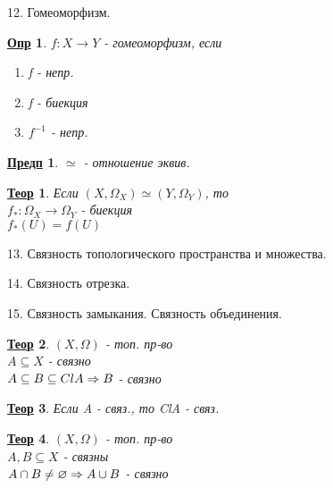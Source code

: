 \documentclass[12pt, fleqn]{article}
\newenvironment{question}[1]{\hspace*{-4em} #1}{\newpage}
\newcommand{\ra}{\Rightarrow}
\theoremstyle{nonumbermarginbreak}
\newtheorem{theorem}{\hspace*{-2em}\underline{\bfseries Теор}}[section]
\newtheorem{definition}{\hspace*{-2em}\underline{\bfseries Опр}}[section]
\newtheorem{hypothesis}{\hspace*{-2em}\underline{\bfseries Предп}}[section]
\begin{document}
    \begin{question}{12. Гомеоморфизм.}
        \begin{definition} 
            $f: X \rightarrow Y$ - гомеоморфизм, если\\
            \begin{enumerate}
                \item f - непр.
                \item f - биекция
                \item $f^{-1}$ - непр.
            \end{enumerate}
        \end{definition}

        \begin{hypothesis} 
            $\simeq$ - отношение эквив.
        \end{hypothesis}

        \begin{theorem} 
            Если $(X, \Omega_X) \simeq (Y, \Omega_Y)$, то\\
            $f_*: \Omega_X \rightarrow \Omega_Y$ - биекция\\
            $f_*(U) = f(U)$
        \end{theorem}
    \end{question}

    \begin{question}{13. Связность топологического пространства и множества.}
        
    \end{question}

    \begin{question}{14. Связность отрезка.}
        
    \end{question}

    \begin{question}{15. Связность замыкания. Связность объединения.}
        \begin{theorem} 
            $(X, \Omega)$ - топ. пр-во\\
            $A \subseteq X$ - связно\\
            $A \subseteq B \subseteq Cl A\\ \ra B$ - связно
        \end{theorem}

        \begin{theorem} 
            Если A - связ., то ClA - связ.
        \end{theorem}

        \begin{theorem} 
            $(X, \Omega)$ - топ. пр-во\\
            $A, B \subseteq X$ - связны\\
            $A \cap B \neq \varnothing\\ \ra A \cup B $ - связно
        \end{theorem}
    \end{question}
\end{document}
